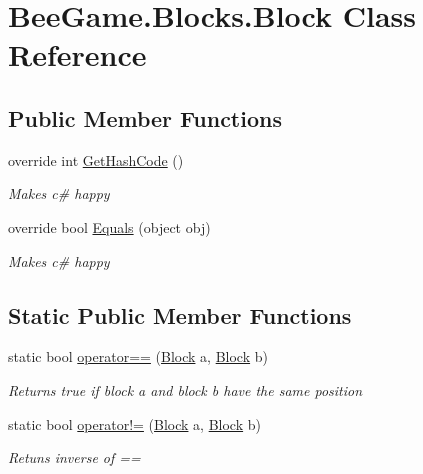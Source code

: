 \hypertarget{class_bee_game_1_1_blocks_1_1_block}{}\section{Bee\+Game.\+Blocks.\+Block Class Reference}
\label{class_bee_game_1_1_blocks_1_1_block}
\subsection*{Public Member Functions}
\begin{DoxyCompactItemize}
\item 
override int \hyperlink{class_bee_game_1_1_blocks_1_1_block_a803b906cb4fcfdb10157177a1468dbac}{Get\+Hash\+Code} ()
\begin{DoxyCompactList}\small\item\em Makes c\# happy \end{DoxyCompactList}\item 
override bool \hyperlink{class_bee_game_1_1_blocks_1_1_block_a03187300c8fd940defb0dbe2793d1d83}{Equals} (object obj)
\begin{DoxyCompactList}\small\item\em Makes c\# happy \end{DoxyCompactList}\end{DoxyCompactItemize}
\subsection*{Static Public Member Functions}
\begin{DoxyCompactItemize}
\item 
static bool \hyperlink{class_bee_game_1_1_blocks_1_1_block_a620f4aba15b9280f1c659dc4557f8cd8}{operator==} (\hyperlink{class_bee_game_1_1_blocks_1_1_block}{Block} a, \hyperlink{class_bee_game_1_1_blocks_1_1_block}{Block} b)
\begin{DoxyCompactList}\small\item\em Returns true if block a and block b have the same position \end{DoxyCompactList}\item 
static bool \hyperlink{class_bee_game_1_1_blocks_1_1_block_ac5ac088908d491883260b5c24d3caf79}{operator!=} (\hyperlink{class_bee_game_1_1_blocks_1_1_block}{Block} a, \hyperlink{class_bee_game_1_1_blocks_1_1_block}{Block} b)
\begin{DoxyCompactList}\small\item\em Retuns inverse of == \end{DoxyCompactList}\end{DoxyCompactItemize}
